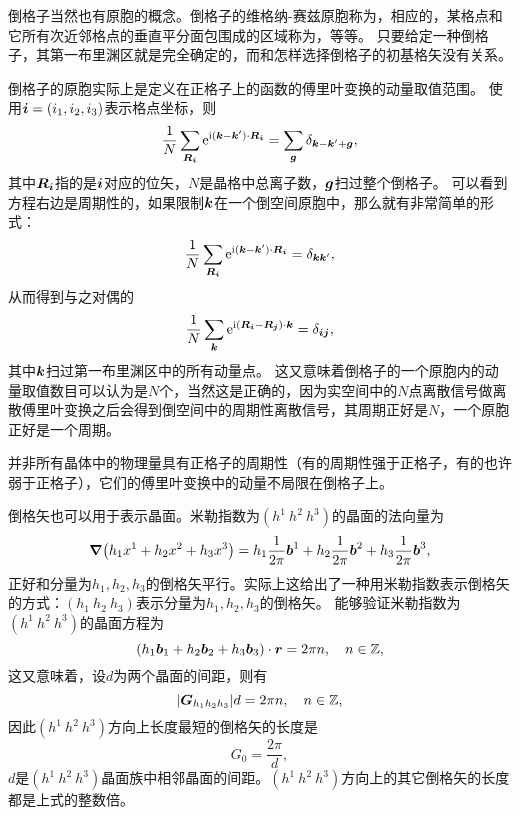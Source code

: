 倒格子当然也有原胞的概念。倒格子的维格纳-赛兹原胞称为，相应的，某格点和它所有次近邻格点的垂直平分面包围成的区域称为，等等。
只要给定一种倒格子，其第一布里渊区就是完全确定的，而和怎样选择倒格子的初基格矢没有关系。

倒格子的原胞实际上是定义在正格子上的函数的傅里叶变换的动量取值范围。
使用$\vb*{i}=(i_1, i_2, i_3)$表示格点坐标，则
\begin{equation}
    \frac{1}{N} \sum_{\vb*{R}_{\vb*{i}}} \mathrm{e}^{\mathrm{i} (\vb*{k} - \vb*{k}') \cdot \vb*{R}_{\vb*{i}}} = \sum_{\vb*{g}} \delta_{\vb*{k} - \vb*{k}' + \vb*{g}},
\end{equation}
其中$\vb*{R}_{\vb*{i}}$指的是$\vb*{i}$对应的位矢，$N$是晶格中总离子数，$\vb*{g}$扫过整个倒格子。
可以看到方程右边是周期性的，如果限制$\vb*{k}$在一个倒空间原胞中，那么就有非常简单的形式：
\begin{equation}
    \frac{1}{N} \sum_{\vb*{R}_{\vb*{i}}} \mathrm{e}^{\mathrm{i} (\vb*{k} - \vb*{k}') \cdot \vb*{R}_{\vb*{i}}} = \delta_{\vb*{k} \vb*{k}'},
\end{equation}
从而得到与之对偶的
\[
    \frac{1}{N} \sum_{\vb*{k}} \mathrm{e}^{\mathrm{i} (\vb*{R}_{\vb*{i}} - \vb*{R}_{\vb*{j}}) \cdot \vb*{k}} = \delta_{\vb*{i} \vb*{j}},
\]
其中$\vb*{k}$扫过第一布里渊区中的所有动量点。
这又意味着倒格子的一个原胞内的动量取值数目可以认为是$N$个，当然这是正确的，因为实空间中的$N$点离散信号做离散傅里叶变换之后会得到倒空间中的周期性离散信号，其周期正好是$N$，一个原胞正好是一个周期。

并非所有晶体中的物理量具有正格子的周期性（有的周期性强于正格子，有的也许弱于正格子），它们的傅里叶变换中的动量不局限在倒格子上。

倒格矢也可以用于表示晶面。米勒指数为$(h^1 \  h^2 \  h^3)$的晶面的法向量为
\[
    \grad(h_1 x^1 + h_2 x^2 + h_3 x^3) = h_1 \frac{1}{2\pi} \vb*{b}^1 + h_2 \frac{1}{2\pi} \vb*{b}^2 + h_3 \frac{1}{2\pi} \vb*{b}^3,
\]
正好和分量为$h_1, h_2, h_3$的倒格矢平行。实际上这给出了一种用米勒指数表示倒格矢的方式：$(h_1 \ h_2 \ h_3)$表示分量为$h_1, h_2, h_3$的倒格矢。
能够验证米勒指数为$(h^1 \  h^2 \  h^3)$的晶面方程为
\begin{equation}
    (h_1 \vb*{b}_1 + h_2 \vb*{b}_2 + h_3 \vb*{b}_3) \cdot \vb*{r} = 2 \pi n, \quad n \in \mathbb{Z},
\end{equation}
这又意味着，设$d$为两个晶面的间距，则有
\begin{equation}
    \abs{\vb*{G}_{h_1 h_2 h_3}} d = 2 \pi n, \quad n \in \mathbb{Z},
\end{equation}
因此$(h^1 \  h^2 \  h^3)$方向上长度最短的倒格矢的长度是
\begin{equation}
    G_0 = \frac{2\pi}{d},
    \label{eq:miller-distance}
\end{equation}
$d$是$(h^1 \  h^2 \  h^3)$晶面族中相邻晶面的间距。$(h^1 \  h^2 \  h^3)$方向上的其它倒格矢的长度都是上式的整数倍。

